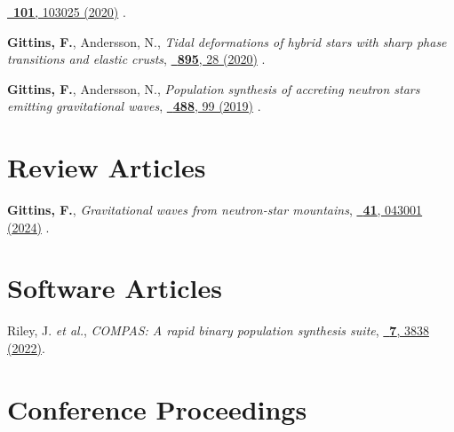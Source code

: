 \begin{etaremune}[start=\value{pubCounter}]
    \href{https://doi.org/10.1103/PhysRevD.101.103025}%
    {\prd\ \textbf{101}, 103025 (2020)}
    .
    \item \textbf{Gittins, F.}, Andersson, N.,
    \textit{Tidal deformations of hybrid stars with sharp phase transitions and
    elastic crusts},
    \href{https://doi.org/10.3847/1538-4357/ab8aca}%
    {\apj\ \textbf{895}, 28 (2020)}
    .
    \item \textbf{Gittins, F.}, Andersson, N.,
    \textit{Population synthesis of accreting neutron stars emitting
    gravitational waves},
    \href{https://doi.org/10.1093/mnras/stz1719}%
    {\mnras\ \textbf{488}, 99 (2019)}
    .
%
    \setcounter{pubCounter}{\value{enumi}}
\end{etaremune}

\section{Review Articles}

\secstartswithlist{}%
\addtocounter{pubCounter}{-1}%
\begin{etaremune}[start=\value{pubCounter}]
    \renewcommand\labelenumi{[\theenumi]}
%
    \item \textbf{Gittins, F.},
    \textit{Gravitational waves from neutron-star mountains},
    \href{https://doi.org/10.1088/1361-6382/ad1c35}%
    {\cqg\ \textbf{41}, 043001 (2024)}
    .
%
    \setcounter{pubCounter}{\value{enumi}}
\end{etaremune}

\section{Software Articles}

\secstartswithlist{}%
\addtocounter{pubCounter}{-1}%
\begin{etaremune}[start=\value{pubCounter}]
    \renewcommand\labelenumi{[\theenumi]}
%
    \item Riley, J. \textit{et al.},
    \textit{COMPAS: A rapid binary population synthesis suite},
    \href{https://doi.org/10.21105/joss.03838}%
    {\joss\ \textbf{7}, 3838 (2022)}.
%
    \setcounter{pubCounter}{\value{enumi}}
\end{etaremune}

\section{Conference Proceedings}

